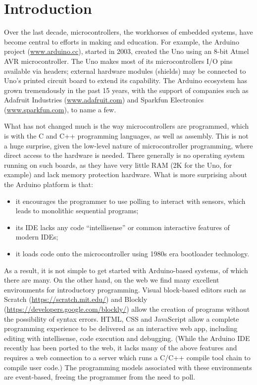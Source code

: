\section{Introduction}
\label{sec:intro}

Over the last decade, microcontrollers, the workhorses of embedded systems, have become 
central to efforts in making and education. For example, the Arduino project (\url{www.arduino.cc}), 
started in 2003, created the Uno using an 8-bit Atmel 
AVR microcontroller. The Uno makes most of its microcontrollers I/O pins available via headers;
external hardware modules (shields) may be connected to Uno's printed circuit board to extend 
its capability.    The Arduino ecosystem has grown tremendously in the past 15 years, 
with the support of companies such as Adafruit Industries (\url{www.adafruit.com}) and 
Sparkfun Electronics (\url{www.sparkfun.com}), to name a few.

What has not changed much is the way microcontrollers are programmed,
which is with the C and C++ programming languages, as well as assembly.   
This is not a huge surprise, given the low-level nature of microcontroller programming, 
where direct access to the hardware is needed. There generally is no operating 
system running on such boards, as they have very little RAM (2K for the Uno, for example) and 
lack memory protection hardware. What is more surprising about the Arduino platform is that:
\begin{itemize}
\item it encourages the programmer to use polling to interact with sensors, 
which leads to monolithic sequential programs;
\item its IDE lacks any code ``intellisense'' or common interactive features of modern IDEs;
\item it loads code onto the microcontroller using 1980s era bootloader technology.
\end{itemize}
As a result, it is not simple to get started with Arduino-based systems, of which there are many. 
On the other hand, on the web we find many excellent environments for introductory programming. 
Visual block-based editors such as Scratch (\url{https://scratch.mit.edu/}) and Blockly (\url{https://developers.google.com/blockly/}) 
allow the creation of programs without the possibility of syntax errors. 
HTML, CSS and JavaScript allow a complete programming experience to be delivered as an interactive 
web app, including editing with intellisense, code execution and debugging. (While the Arduino IDE recently 
has been ported to the web, it lacks many of the above features and requires a web connection to a server which runs 
a C/C++ compile tool chain to compile user code.) The programming models associated with these environments are 
event-based, freeing the programmer from the need to poll.

